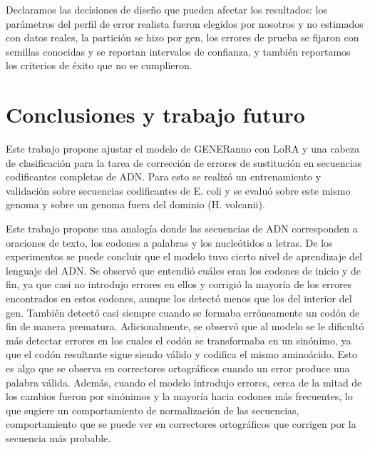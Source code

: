 \documentclass[sigconf,nonacm]{acmart}
\begin{document}
Declaramos las decisiones de diseño que pueden afectar los resultados: los parámetros del perfil de error realista fueron elegidos por nosotros y no estimados con datos reales, la partición se hizo por gen, los errores de prueba se fijaron con semillas conocidas y se reportan intervalos de confianza, y también reportamos los criterios de éxito que no se cumplieron.

\section{Conclusiones y trabajo futuro}\label{sec:conclusiones}

Este trabajo propone ajustar el modelo de GENERanno con LoRA y una cabeza de clasificación para la tarea de corrección de errores de sustitución en secuencias codificantes completas de ADN. Para esto se realizó un entrenamiento y validación sobre secuencias codificantes de E. coli y se evaluó sobre este mismo genoma y sobre un genoma fuera del dominio (H. volcanii).

Este trabajo propone una analogía donde las secuencias de ADN corresponden a oraciones de texto, los codones a palabras y los nucleótidos a letras. De los experimentos se puede concluir que el modelo tuvo cierto nivel de aprendizaje del lenguaje del ADN. Se observó que entendió cuáles eran los codones de inicio y de fin, ya que casi no introdujo errores en ellos y corrigió la mayoría de los errores encontrados en estos codones, aunque los detectó menos que los del interior del gen. También detectó casi siempre cuando se formaba erróneamente un codón de fin de manera prematura. Adicionalmente, se observó que al modelo se le dificultó más detectar errores en los cuales el codón se transformaba en un sinónimo, ya que el codón resultante sigue siendo válido y codifica el mismo aminoácido. Esto es algo que se observa en correctores ortográficos cuando un error produce una palabra válida. Además, cuando el modelo introdujo errores, cerca de la mitad de los cambios fueron por sinónimos y la mayoría hacia codones más frecuentes, lo que sugiere un comportamiento de normalización de las secuencias, comportamiento que se puede ver en correctores ortográficos que corrigen por la secuencia más probable.
\end{document}
